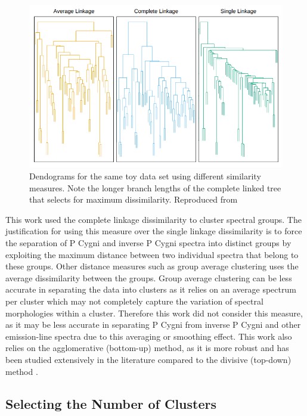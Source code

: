 \begin{figure}[!htb]
\centering
\includegraphics[scale=0.60]{figures/complete linkage.png}
\caption{Dendograms for the same toy data set using different similarity measures. Note the longer branch lengths of the complete linked tree that selects for maximum dissimilarity. Reproduced from \citet{hastie2009elements}}
\end{figure}

This work used the complete linkage dissimilarity to cluster spectral groups. The justification for using this measure over the single linkage dissimilarity is to force the separation of P Cygni and inverse P Cygni spectra into distinct groups by exploiting the maximum distance between two individual spectra that belong to these groups. Other distance measures such as group average clustering uses the average dissimilarity between the groups. Group average clustering can be less accurate in separating the data into clusters as it relies on an average spectrum per cluster which may not completely capture the variation of spectral morphologies within a cluster. Therefore this work did not consider this measure, as it may be less accurate in separating P Cygni from inverse P Cygni and other emission-line spectra due to this averaging or smoothing effect. This work also relies on the agglomerative (bottom-up) method, as it is more robust and has been studied extensively in the literature compared to the divisive (top-down) method \citep{hastie2009elements}.

\subsection{Selecting the Number of Clusters}

